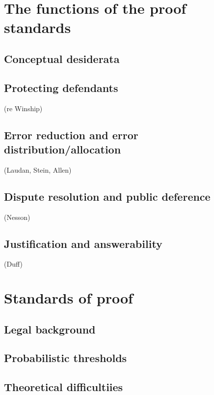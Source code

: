 \documentclass[]{book}
\begin{document}
\chapter{The functions of the proof standards}

\section{Conceptual desiderata}

\section{Protecting defendants}

(re Winship)

\section{Error reduction and error distribution/allocation}

(Laudan, Stein, Allen)

\section{Dispute resolution and public deference}

(Nesson)

\section{Justification and answerability}

(Duff)

\chapter{Standards of proof}

\section{Legal background}

\section{Probabilistic thresholds}

\section{Theoretical difficultiies}
\end{document}
